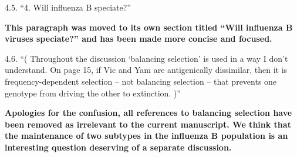 \documentclass[11pt,oneside,letterpaper]{article}
\begin{document}
4.5. ``4. Will influenza B speciate?''

\textbf{This paragraph was moved to its own section titled ``Will influenza B viruses speciate?'' and has been made more concise and focused.}

4.6. ``( Throughout the discussion `balancing selection' is used in a way I don't understand.
On page 15, if Vic and Yam are antigenically dissimilar, then it is frequency-dependent selection -- not balancing selection -- that prevents one genotype from driving the other to extinction. )''

\textbf{Apologies for the confusion, all references to balancing selection have been removed as irrelevant to the current manuscript.
We think that the maintenance of two subtypes in the influenza B population is an interesting question deserving of a separate discussion.}
\end{document}
